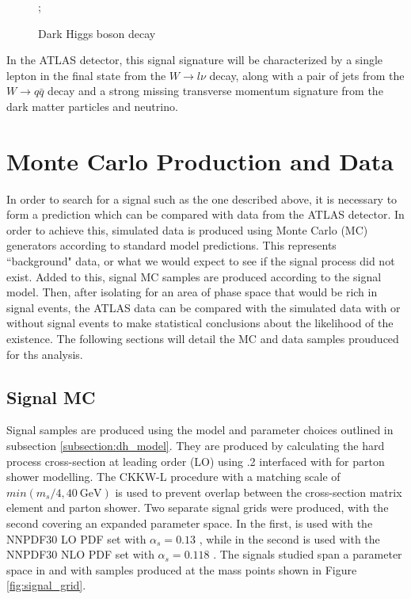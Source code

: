 \begin{figure}[H]
    \centering
    ;
    \caption{Dark Higgs boson decay}
    \label{fig:dh_feynman}
\end{figure}

In the ATLAS detector, this signal signature will be characterized by a single lepton in the final state from the $ W \rightarrow l\nu $ decay, along with a pair of jets from the $ W \rightarrow q\bar{q} $ decay and a strong missing transverse momentum signature from the dark matter particles and neutrino.

\section{Monte Carlo Production and Data}
\label{section:mc_prod}
In order to search for a signal such as the one described above, it is necessary to form a prediction which can be compared with data from the ATLAS detector. In order to achieve this, simulated data is produced using Monte Carlo (MC) generators according to standard model predictions. This represents ``background" data, or what we would expect to see if the signal process did not exist. Added to this, signal MC samples are produced according to the signal model. Then, after isolating for an area of phase space that would be rich in signal events, the ATLAS data can be compared with the simulated data with or without signal events to make statistical conclusions about the likelihood of the existence. The following sections will detail the MC and data samples prouduced for ths analysis.

\subsection{Signal MC}
\label{subsection:mc_signal}
Signal samples are produced using the model and parameter choices outlined in subsection \ref{subsection:dh_model}. They are produced by calculating the hard process cross-section at leading order (LO) using .2 \cite{MadGraph} interfaced with  \cite{Pythia} for parton shower modelling. The CKKW-L \cite{CKKW} procedure with a matching scale of $min(m_s/4, 40~\text{GeV})$ is used to prevent overlap between the cross-section matrix element and parton shower. Two separate signal grids were produced, with the second covering an expanded parameter space. In the first, \mgamc is used with the NNPDF30 LO PDF set with $\alpha_s = 0.13$ \cite{PDF30}, while in the second \mgamc is used with the NNPDF30 NLO PDF set with $\alpha_s = 0.118$ \cite{PDF30}. The signals studied span a parameter space in \ms and \mZp with samples produced at the mass points shown in Figure \ref{fig:signal_grid}.

